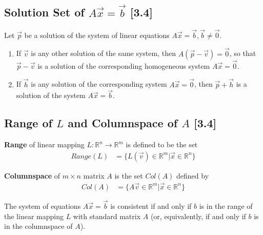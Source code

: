 \documentclass[a4paper,9pt]{extarticle}
\begin{document}
\begin{multicols*}{2}
\subsection{Solution Set of $A \vec{x} = \vec{b}$ [3.4]}
Let $\vec{p}$ be a solution of the system of linear equations $A \vec{x} = \vec{b}, \vec{b} \neq \vec{0}$.

\begin{enumerate}[label=\bfseries (\arabic*)] \itemsep0pt \parskip0pt 
    \item If $\vec{v}$ is any other solution of the same system, then $A(\vec{p} - \vec{v}) = \vec{0}$, so that $\vec{p} - \vec{v}$ is a solution of the corresponding homogeneous system $A \vec{x} = \vec{0}$.
    \item If $\vec{h}$ is any solution of the corresponding system $A \vec{x} = \vec{0}$, then $\vec{p} + \vec{h}$ is a solution of the system $A \vec{x} = \vec{b}$.
\end{enumerate}


\subsection{Range of $L$ and Columnspace of $A$ [3.4]}
\textbf{Range} of linear mapping $L: \mathbb{R}^n \to \mathbb{R}^m$ is defined to be the set
\begin{equation} \label{3.4-2}
    \begin{split}
        Range(L) & = \{L(\vec{v}) \in \mathbb{R}^m | \vec{x} \in \mathbb{R}^n\}
    \end{split}
\end{equation}

\noindent \textbf{Columnspace} of $m \times n$ matrix $A$ is the set $Col(A)$ defined by
\begin{equation} \label{3.4-3}
    \begin{split}
        Col(A) & = \{A \vec{v} \in \mathbb{R}^m | \vec{x} \in \mathbb{R}^n\}
    \end{split}
\end{equation}

The system of equations $A \vec{x} = \vec{b}$ is consistent if and only if $b$ is in the range of the linear mapping $L$ with standard matrix $A$ (or, equivalently, if and only if $b$ is in the columnspace of $A$).



\end{multicols*}
\end{document}
